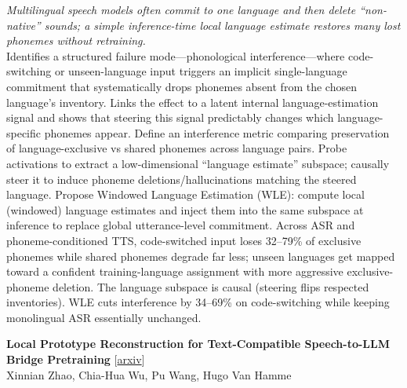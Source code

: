 \documentclass[12pt,letterpaper]{article}
\begin{document}
{\small\textit{Multilingual speech models often commit to one language and then delete ``non-native'' sounds; a simple inference-time local language estimate restores many lost phonemes without retraining.}}\\[1pt]
{\footnotesize Identifies a structured failure mode---phonological interference---where code-switching or unseen-language input triggers an implicit single-language commitment that systematically drops phonemes absent from the chosen language's inventory. Links the effect to a latent internal language-estimation signal and shows that steering this signal predictably changes which language-specific phonemes appear. Define an interference metric comparing preservation of language-exclusive vs shared phonemes across language pairs. Probe activations to extract a low-dimensional ``language estimate'' subspace; causally steer it to induce phoneme deletions/hallucinations matching the steered language. Propose Windowed Language Estimation (WLE): compute local (windowed) language estimates and inject them into the same subspace at inference to replace global utterance-level commitment. Across ASR and phoneme-conditioned TTS, code-switched input loses 32--79\% of exclusive phonemes while shared phonemes degrade far less; unseen languages get mapped toward a confident training-language assignment with more aggressive exclusive-phoneme deletion. The language subspace is causal (steering flips respected inventories). WLE cuts interference by 34--69\% on code-switching while keeping monolingual ASR essentially unchanged.}

\medskip

{\small\textbf{Local Prototype Reconstruction for Text-Compatible Speech-to-LLM Bridge Pretraining}} {\scriptsize[\href{https://arxiv.org/abs/2610.11159}{arxiv}]}\\
{\scriptsize Xinnian Zhao, Chia-Hua Wu, Pu Wang, Hugo Van Hamme}\\
\end{document}
